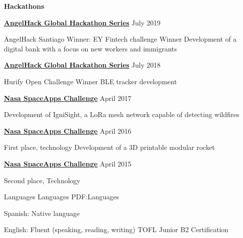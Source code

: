 \documentclass[letterpaper,yyyy,draft]{simpleresumecv}
\begin{document}
\begin{Body}
{    \BigGap
    \BulletItem
    \textbf{Hackathons}
    {
        {
            \Gap
            \SubBulletItem
            \href{https://angelhack.com}{\textbf{AngelHack Global Hackathon Series}}
            \hfill
            July 2019
            \begin{Detail}
            \SubItem
            AngelHack Santiago Winner: EY Fintech challenge Winner \newline
            Development of a digital bank with a focus \newline on new workers and immigrants
            \end{Detail}
        }

        {
            \BigGap
            \SubBulletItem
            \href{https://angelhack.com}{\textbf{AngelHack Global Hackathon Series}}
            \hfill
            July 2018
            \begin{Detail}
            \SubItem
            Hurify Open Challenge Winner \newline
            BLE tracker development
            \end{Detail}
        }

        {
            \BigGap
            \SubBulletItem
            \href{https://spaceappschallenge.org}{\textbf{Nasa SpaceApps Challenge}}
            \hfill
            April 2017
            \begin{Detail}
            \SubItem
            Development of IgniSight, a LoRa mesh network capable \newline of detecting wildfires
            \end{Detail}
        }

        {
            \BigGap
            \SubBulletItem
            \href{https://spaceappschallenge.org}{\textbf{Nasa SpaceApps Challenge}}
            \hfill
            April 2016
            \begin{Detail}
            \SubItem
            First place, technology \newline
            Development of a 3D printable modular rocket
            \end{Detail}
        }

        {
            \BigGap
            \SubBulletItem
            \href{https://spaceappschallenge.org}{\textbf{Nasa SpaceApps Challenge}}
            \hfill
            April 2015
            \begin{Detail}
            \SubItem
            Second place, Technology
            \end{Detail}
        }
    }
}


\Section
{Languages}
{Languages}
{PDF:Languages}
{
    {
        \BulletItem
        Spanish: Native language
    }

    \Gap

    {
        \BulletItem
        English: Fluent (speaking, reading, writing)
        \SubBulletItem
        TOFL Junior B2 Certification
    }
}
\end{Body}
\end{document}
